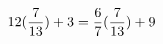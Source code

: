 \documentclass[preview]{standalone}
\begin{document}
\begin{align*}
\special{dvisvgm:raw <g id='unique000'>}12(\frac{7}{13}) + 3 = \frac{6}{7} (\frac{7}{13}) + 9\special{dvisvgm:raw </g>}
\end{align*}
\end{document}
